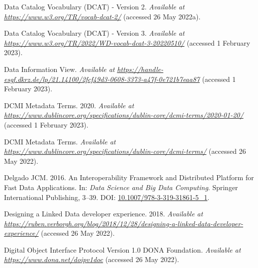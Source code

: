 \begin{CSLReferences}{1}{0}
\leavevmode{}%
Data Catalog Vocabulary (DCAT) - Version 2. \emph{Available at} \href{https://www.w3.org/TR/vocab-dcat-2/}{\emph{https://www.w3.org/TR/vocab-dcat-2/}} (accessed 26 May 2022a).

\leavevmode{}%
Data Catalog Vocabulary (DCAT) - Version 3. \emph{Available at} \href{https://www.w3.org/TR/2022/WD-vocab-dcat-3-20220510/}{\emph{https://www.w3.org/TR/2022/WD-vocab-dcat-3-20220510/}} (accessed 1 February 2023).

\leavevmode{}%
Data Information View. \emph{Available at} \href{https://handle-esgf.dkrz.de/lp/21.14100/2fcf49d3-0608-3373-a47f-0e721b7eaa87}{\emph{https://handle-esgf.dkrz.de/lp/21.14100/2fcf49d3-0608-3373-a47f-0e721b7eaa87}} (accessed 1 February 2023).

\leavevmode{}%
DCMI Metadata Terms. 2020. \emph{Available at} \href{https://www.dublincore.org/specifications/dublin-core/dcmi-terms/2020-01-20/}{\emph{https://www.dublincore.org/specifications/dublin-core/dcmi-terms/2020-01-20/}} (accessed 1 February 2023).

\leavevmode{}%
DCMI Metadata Terms. \emph{Available at} \href{https://www.dublincore.org/specifications/dublin-core/dcmi-terms/}{\emph{https://www.dublincore.org/specifications/dublin-core/dcmi-terms/}} (accessed 26 May 2022).

\leavevmode{}%
Delgado JCM. 2016. An Interoperability Framework and Distributed Platform for Fast Data Applications. In: \emph{Data Science and Big Data Computing}. Springer International Publishing, 3--39. DOI: \href{https://doi.org/10.1007/978-3-319-31861-5_1}{10.1007/978-3-319-31861-5\_1}.

\leavevmode{}%
Designing a Linked Data developer experience. 2018. \emph{Available at} \href{https://ruben.verborgh.org/blog/2018/12/28/designing-a-linked-data-developer-experience/}{\emph{https://ruben.verborgh.org/blog/2018/12/28/designing-a-linked-data-developer-experience/}} (accessed 26 May 2022).

\leavevmode{}%
Digital Object Interface Protocol Version 1.0 \textbar{} DONA Foundation. \emph{Available at} \href{https://www.dona.net/doipv1doc}{\emph{https://www.dona.net/doipv1doc}} (accessed 26 May 2022).


\end{CSLReferences}
